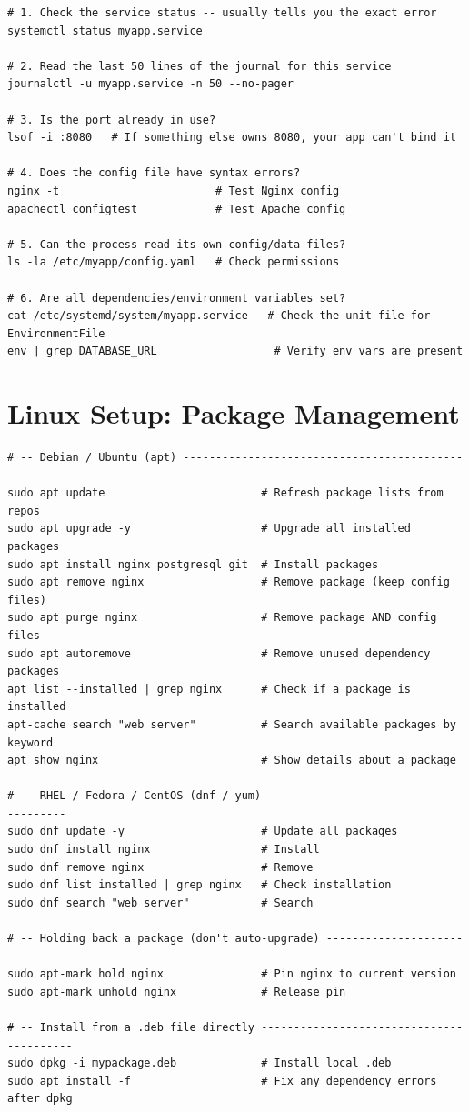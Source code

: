 \documentclass[11pt, letterpaper]{article}
\begin{document}
\begin{lstlisting}[style=shell, caption={Systematic checklist when a service fails to start}]
# 1. Check the service status -- usually tells you the exact error
systemctl status myapp.service

# 2. Read the last 50 lines of the journal for this service
journalctl -u myapp.service -n 50 --no-pager

# 3. Is the port already in use?
lsof -i :8080   # If something else owns 8080, your app can't bind it

# 4. Does the config file have syntax errors?
nginx -t                        # Test Nginx config
apachectl configtest            # Test Apache config

# 5. Can the process read its own config/data files?
ls -la /etc/myapp/config.yaml   # Check permissions

# 6. Are all dependencies/environment variables set?
cat /etc/systemd/system/myapp.service   # Check the unit file for EnvironmentFile
env | grep DATABASE_URL                  # Verify env vars are present
\end{lstlisting}

\section*{Linux Setup: Package Management}

\begin{lstlisting}[style=shell, caption={apt (Debian/Ubuntu) and dnf/yum (RHEL/Fedora/CentOS)}]
# -- Debian / Ubuntu (apt) -----------------------------------------------------
sudo apt update                        # Refresh package lists from repos
sudo apt upgrade -y                    # Upgrade all installed packages
sudo apt install nginx postgresql git  # Install packages
sudo apt remove nginx                  # Remove package (keep config files)
sudo apt purge nginx                   # Remove package AND config files
sudo apt autoremove                    # Remove unused dependency packages
apt list --installed | grep nginx      # Check if a package is installed
apt-cache search "web server"          # Search available packages by keyword
apt show nginx                         # Show details about a package

# -- RHEL / Fedora / CentOS (dnf / yum) ---------------------------------------
sudo dnf update -y                     # Update all packages
sudo dnf install nginx                 # Install
sudo dnf remove nginx                  # Remove
sudo dnf list installed | grep nginx   # Check installation
sudo dnf search "web server"           # Search

# -- Holding back a package (don't auto-upgrade) -------------------------------
sudo apt-mark hold nginx               # Pin nginx to current version
sudo apt-mark unhold nginx             # Release pin

# -- Install from a .deb file directly -----------------------------------------
sudo dpkg -i mypackage.deb             # Install local .deb
sudo apt install -f                    # Fix any dependency errors after dpkg
\end{lstlisting}
\end{document}
